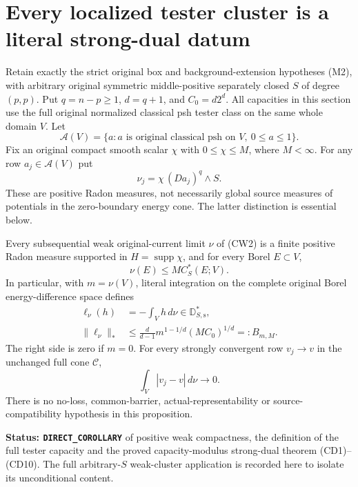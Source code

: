 \section{Every localized tester cluster is a literal strong-dual datum}
\label{sec:r12-capacity-cluster-strong-dual}

Retain exactly the strict original box and background-extension
hypotheses (M2), with arbitrary original symmetric middle-positive
separately closed $S$ of degree $(p,p)$. Put $q=n-p\geq1$,
$d=q+1$, and $C_0=d2^d$. All capacities in this section use the
full original normalized classical psh tester class on the same
whole domain $V$. Let
\[
 \mathcal A(V)=\{a: a\text{ is original classical psh on }V,
                                      \ 0\leq a\leq1\}.
 \tag{CW1}
\]
Fix an original compact smooth scalar $\chi$ with $0\leq\chi\leq M$,
where $M<\infty$. For any row $a_j\in\mathcal A(V)$ put
\[
       \nu_j=\chi\,(Da_j)^q\wedge S.
 \tag{CW2}
\]
These are positive Radon measures, not necessarily global source
measures of potentials in the zero-boundary energy cone. The latter
distinction is essential below.

\begin{proposition}
\label{prop:r12-capacity-cluster-literal-dual}
Every subsequential weak original-current limit $\nu$ of (CW2)
is a finite positive Radon measure supported in
$H=\operatorname{supp}\chi$, and for every Borel $E\subset V$,
\[
                         \nu(E)\leq M C_S^*(E;V).
 \tag{CW3}
\]
In particular, with $m=\nu(V)$, literal integration on the complete
original Borel energy-difference space defines
\[
 \begin{split}
 \ell_\nu(h)&=-\int_Vh\,d\nu\in\mathbb D_{S,\mathrm s}^*,\\
 \|\ell_\nu\|_*
       &\leq \frac{d}{d-1}
                 m^{1-1/d}(M C_0)^{1/d}=:B_{m,M}.
 \end{split}
 \tag{CW4}
\]
The right side is zero if $m=0$. For every strongly convergent
row $v_j\to v$ in the unchanged full cone $\mathscr C$,
\[
                         \int_V|v_j-v|\,d\nu\longrightarrow0.
 \tag{CW5}
\]
There is no no-loss, common-barrier, actual-representability or
source-compatibility hypothesis in this proposition.
\end{proposition}

\noindent\textbf{Status: \texttt{DIRECT\_COROLLARY}} of
positive weak compactness, the definition of the full tester
capacity and the proved capacity-modulus strong-dual theorem
(CD1)--(CD10). The full arbitrary-$S$ weak-cluster application
is recorded here to isolate its unconditional content.

